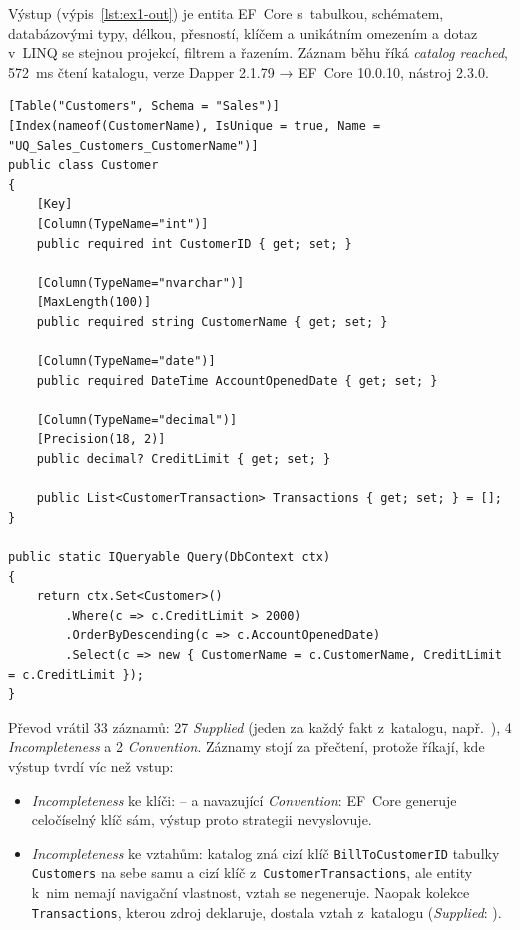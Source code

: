 \documentclass{article}
\begin{document}
Výstup (výpis~\ref{lst:ex1-out}) je entita EF~Core s~tabulkou, schématem, databázovými typy, délkou, přesností, klíčem a unikátním omezením a dotaz v~LINQ se stejnou projekcí, filtrem a řazením. Záznam běhu říká \emph{catalog reached}, 572~ms čtení katalogu, verze Dapper 2.1.79 → EF~Core 10.0.10, nástroj 2.3.0.

\begin{lstlisting}[language={[Sharp]C},caption={Příklad 1, výstup: \texttt{Customer.cs} a dotaz.},label={lst:ex1-out}]
[Table("Customers", Schema = "Sales")]
[Index(nameof(CustomerName), IsUnique = true, Name = "UQ_Sales_Customers_CustomerName")]
public class Customer
{
    [Key]
    [Column(TypeName="int")]
    public required int CustomerID { get; set; }

    [Column(TypeName="nvarchar")]
    [MaxLength(100)]
    public required string CustomerName { get; set; }

    [Column(TypeName="date")]
    public required DateTime AccountOpenedDate { get; set; }

    [Column(TypeName="decimal")]
    [Precision(18, 2)]
    public decimal? CreditLimit { get; set; }

    public List<CustomerTransaction> Transactions { get; set; } = [];
}

public static IQueryable Query(DbContext ctx)
{
    return ctx.Set<Customer>()
        .Where(c => c.CreditLimit > 2000)
        .OrderByDescending(c => c.AccountOpenedDate)
        .Select(c => new { CustomerName = c.CustomerName, CreditLimit = c.CreditLimit });
}
\end{lstlisting}

Převod vrátil 33 záznamů: 27 \emph{Supplied} (jeden za každý fakt z~katalogu, např.\ ), 4 \emph{Incompleteness} a 2 \emph{Convention}. Záznamy stojí za přečtení, protože říkají, kde výstup tvrdí víc než vstup:

\begin{itemize}[leftmargin=*,itemsep=1pt]
\item \emph{Incompleteness} ke klíči:  -- a navazující \emph{Convention}: EF~Core generuje celočíselný klíč sám, výstup proto strategii nevyslovuje.
\item \emph{Incompleteness} ke vztahům: katalog zná cizí klíč \texttt{BillToCustomerID} tabulky \texttt{Customers} na sebe samu a cizí klíč z~\texttt{CustomerTransactions}, ale entity k~nim nemají navigační vlastnost, vztah se negeneruje. Naopak kolekce \texttt{Transactions}, kterou zdroj deklaruje, dostala vztah z~katalogu (\emph{Supplied}: ).
\end{itemize}
\end{document}
